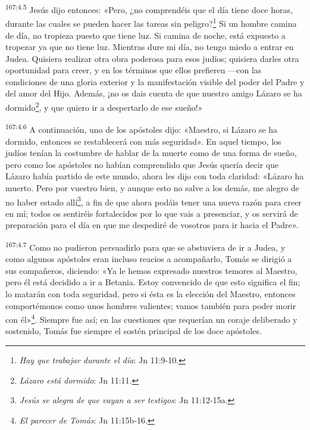 \par
\textsuperscript{167:4.5} Jesús dijo entonces: «Pero, ¿no comprendéis que el día tiene doce horas, durante las cuales se pueden hacer las tareas sin peligro?\footnote{\textit{Hay que trabajar durante el día}: Jn 11:9-10.} Si un hombre camina de día, no tropieza puesto que tiene luz. Si camina de noche, está expuesto a tropezar ya que no tiene luz. Mientras dure mi día, no tengo miedo a entrar en Judea. Quisiera realizar otra obra poderosa para esos judíos; quisiera darles otra oportunidad para creer, y en los términos que ellos prefieren ---con las condiciones de una gloria exterior y la manifestación visible del poder del Padre y del amor del Hijo. Además, ¡no os dais cuenta de que nuestro amigo Lázaro se ha dormido\footnote{\textit{Lázaro está dormido}: Jn 11:11.}, y que quiero ir a despertarlo de ese sueño!»

\par
\textsuperscript{167:4.6} A continuación, uno de los apóstoles dijo: «Maestro, si Lázaro se ha dormido, entonces se restablecerá con más seguridad». En aquel tiempo, los judíos tenían la costumbre de hablar de la muerte como de una forma de sueño, pero como los apóstoles no habían comprendido que Jesús quería decir que Lázaro había partido de este mundo, ahora les dijo con toda claridad: «Lázaro ha muerto. Pero por vuestro bien, y aunque esto no salve a los demás, me alegro de no haber estado allí\footnote{\textit{Jesús se alegra de que vayan a ser testigos}: Jn 11:12-15a.}, a fin de que ahora podáis tener una nueva razón para creer en mí; todos os sentiréis fortalecidos por lo que vais a presenciar, y os servirá de preparación para el día en que me despediré de vosotros para ir hacia el Padre».

\par
\textsuperscript{167:4.7} Como no pudieron persuadirlo para que se abstuviera de ir a Judea, y como algunos apóstoles eran incluso reacios a acompañarlo, Tomás se dirigió a sus compañeros, diciendo: «Ya le hemos expresado nuestros temores al Maestro, pero él está decidido a ir a Betania. Estoy convencido de que esto significa el fin; lo matarán con toda seguridad, pero si ésta es la elección del Maestro, entonces comportémonos como unos hombres valientes; vamos también para poder morir con él»\footnote{\textit{El parecer de Tomás}: Jn 11:15b-16.}. Siempre fue así; en las cuestiones que requerían un coraje deliberado y sostenido, Tomás fue siempre el sostén principal de los doce apóstoles.


